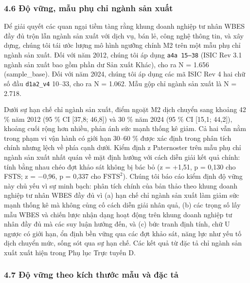 \documentclass[12pt,a4paper]{article}
\begin{document}
\hypertarget{46-ux111ux1ed9-vux1eefng-mux1eabu-phux1ee5-chux1ec9-nguxe0nh-sux1ea3n-xuux1ea5t}{%
\subsubsection{4.6 Độ vững, mẫu phụ chỉ ngành sản
xuất}\label{46-ux111ux1ed9-vux1eefng-mux1eabu-phux1ee5-chux1ec9-nguxe0nh-sux1ea3n-xuux1ea5t}}

Để giải quyết các quan ngại tiềm tàng rằng khung doanh nghiệp tư nhân
WBES đầy đủ trộn lẫn ngành sản xuất với dịch vụ, bán lẻ, công nghệ thông
tin, và xây dựng, chúng tôi tái ước lượng mô hình ngưỡng chính M2 trên
một mẫu phụ chỉ ngành sản xuất. Đối với năm 2012, chúng tôi áp dụng
\texttt{a4a\ 15–38} (ISIC Rev 3.1 ngành sản xuất bao gồm phần dư Sản
xuất Khác), cho ra N = 1.656 (sample\_base). Đối với năm 2024, chúng tôi
áp dụng các mã ISIC Rev 4 hai chữ số đầu \texttt{d1a2\_v4} 10--33, cho
ra N = 1.062. Mẫu gộp chỉ ngành sản xuất là N = 2.718.

Dưới sự hạn chế chỉ ngành sản xuất, điểm ngoặt M2 dịch chuyển sang
khoảng 42 \% năm 2012 (95 \% CI {[}37,8; 46,8{]}) và 30 \% năm 2024 (95
\% CI {[}15,1; 44,2{]}), khoảng cuối rộng hơn nhiều, phản ánh sức mạnh
thống kê giảm. Cả hai vẫn nằm trong phạm vi vận hành có giới hạn 30--60
\% được xác định trong phân tích chính nhưng lệch về phía cạnh dưới.
Kiểm định z Paternoster trên mẫu phụ chỉ ngành sản xuất nhất quán về mặt
định hướng với cách diễn giải kết quả chính: tính bằng nhau chéo đợt
khảo sát không bị bác bỏ (z = +1,51, p = 0,130 cho FSTS; z = −0,96, p =
0,337 cho \(\mathrm{FSTS}^2\)). Chúng tôi báo cáo kiểm định độ vững này
chủ yếu vì sự minh bạch: phân tích chính của bản thảo theo khung doanh
nghiệp tư nhân WBES đầy đủ vì (a) hạn chế chỉ ngành sản xuất làm giảm
sức mạnh thống kê mà không củng cố cách diễn giải nhân quả, (b) các
trọng số lấy mẫu WBES và chiến lược nhận dạng hoạt động trên khung doanh
nghiệp tư nhân đầy đủ mà các suy luận hướng đến, và (c) bức tranh định
tính, chữ U ngược có giới hạn, ổn định bền vững qua các đợt khảo sát,
năng lực như yếu tố dịch chuyển mức, sống sót qua sự hạn chế. Các kết
quả từ đặc tả chỉ ngành sản xuất xuất hiện trong Phụ lục Trực tuyến D.

\hypertarget{47-ux111ux1ed9-vux1eefng-theo-kuxedch-thux1b0ux1edbc-mux1eabu-vuxe0-ux111ux1eb7c-tux1ea3}{%
\subsubsection{4.7 Độ vững theo kích thước mẫu và đặc
tả}\label{47-ux111ux1ed9-vux1eefng-theo-kuxedch-thux1b0ux1edbc-mux1eabu-vuxe0-ux111ux1eb7c-tux1ea3}}
\end{document}

